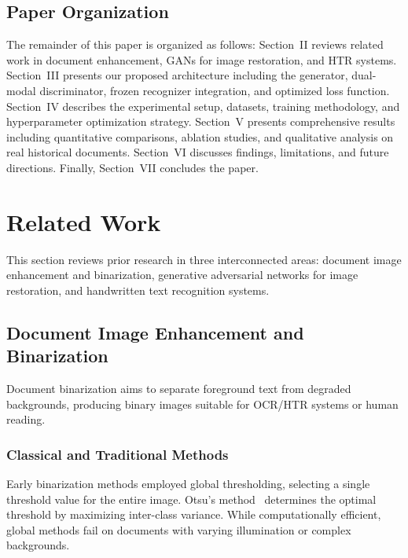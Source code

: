 \documentclass[journal]{IEEEtran}
\begin{document}
\subsection{Paper Organization}

The remainder of this paper is organized as follows: Section~II reviews related work in document enhancement, GANs for image restoration, and HTR systems. Section~III presents our proposed architecture including the generator, dual-modal discriminator, frozen recognizer integration, and optimized loss function. Section~IV describes the experimental setup, datasets, training methodology, and hyperparameter optimization strategy. Section~V presents comprehensive results including quantitative comparisons, ablation studies, and qualitative analysis on real historical documents. Section~VI discusses findings, limitations, and future directions. Finally, Section~VII concludes the paper.

\section{Related Work}

This section reviews prior research in three interconnected areas: document image enhancement and binarization, generative adversarial networks for image restoration, and handwritten text recognition systems.

\subsection{Document Image Enhancement and Binarization}

Document binarization aims to separate foreground text from degraded backgrounds, producing binary images suitable for OCR/HTR systems or human reading.

\subsubsection{Classical and Traditional Methods}

Early binarization methods employed global thresholding, selecting a single threshold value for the entire image. Otsu's method~\cite{otsu1979threshold} determines the optimal threshold by maximizing inter-class variance. While computationally efficient, global methods fail on documents with varying illumination or complex backgrounds.
\end{document}
